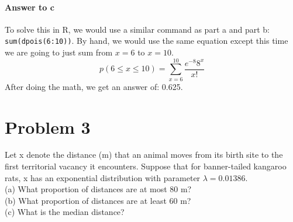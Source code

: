 \documentclass{article}
\newcommand{\code}[1]{\texttt{#1}}
\begin{document}
\iffalse
	From the previous part:
	\begin{displaymath}
		p(4 \le x) = \sum_{x=0}^{4} \frac{e^{-8}8^x}{x!} = 0.0996 %
	\end{displaymath}
	Therefore:
	\begin{displaymath}
		p(5) = \frac{e^{-8}8^5}{5!} = 0.0573 %
	\end{displaymath}
	\begin{displaymath}
		p(6) = \frac{e^{-8}8^6}{6!} = 0.0573 %
	\end{displaymath}
	\begin{displaymath}
		p(7) = \frac{e^{-8}8^7}{7!} = 0.0573 %
	\end{displaymath}
	\begin{displaymath}
		p(8) = \frac{e^{-8}8^8}{8!} = 0.0573 %
	\end{displaymath}
	Now we add the rest together and then subtract from one to get the actual answer.
\fi
	
	\paragraph{Answer to c} To solve this in R, we would use a similar command as part a and part b: \code{sum(dpois(6:10))}. By hand, we would use the same equation except this time we are going to just sum from $x=6$ to $x=10$. 
	\begin{displaymath}
		p(6 \le x \le 10) = \sum_{x=6}^{10} \frac{e^{-8}8^x}{x!}
	\end{displaymath}
	After doing the math, we get an answer of: 0.625. %
	
\clearpage
\section*{Problem 3}

	Let x denote the distance (m) that an animal moves from its birth site to the first territorial 
	vacancy it encounters. Suppose that for banner-tailed kangaroo rats, x has an exponential 
	distribution with parameter $\lambda = 0.01386$. \\

	(a) What proportion of distances are at most 80 m? \\
	(b) What proportion of distances are at least 60 m? \\
	(c) What is the median distance?
\end{document}
